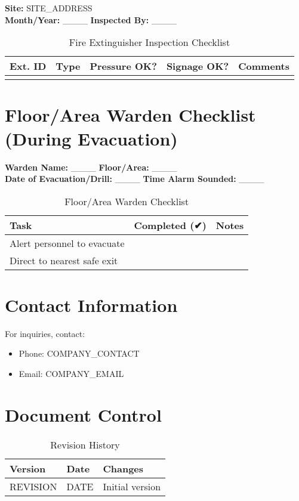 \documentclass[12pt]{article}
\begin{document}
\textbf{Site:} {{SITE_ADDRESS}}\\
\textbf{Month/Year:} \_\_\_\_ \textbf{Inspected By:} \_\_\_\_

\begin{table}[h]
    \centering
    \begin{tabular}{p{3cm}p{3cm}p{2cm}p{3cm}p{3cm}}
        \toprule
        \textbf{Ext. ID} & \textbf{Type} & \textbf{Pressure OK?} & \textbf{Signage OK?} & \textbf{Comments} \\
        \midrule
        & & & & \\
        \bottomrule
    \end{tabular}
    \caption{Fire Extinguisher Inspection Checklist}
\end{table}

\section{Floor/Area Warden Checklist (During Evacuation)}

\textbf{Warden Name:} \_\_\_\_ \textbf{Floor/Area:} \_\_\_\_\\
\textbf{Date of Evacuation/Drill:} \_\_\_\_ \textbf{Time Alarm Sounded:} \_\_\_\_

\begin{table}[h]
    \centering
    \begin{tabular}{p{8cm}p{2cm}p{6cm}}
        \toprule
        \textbf{Task} & \textbf{Completed (✔)} & \textbf{Notes} \\
        \midrule
        Alert personnel to evacuate & & \\
        Direct to nearest safe exit & & \\
        \bottomrule
    \end{tabular}
    \caption{Floor/Area Warden Checklist}
\end{table}

\section{Contact Information}
For inquiries, contact:
\begin{itemize}
    \item Phone: {{COMPANY_CONTACT}}
    \item Email: {{COMPANY_EMAIL}}
\end{itemize}

\section{Document Control}
\begin{table}[h]
    \centering
    \begin{tabular}{p{3cm}p{3cm}p{6cm}}
        \toprule
        \textbf{Version} & \textbf{Date} & \textbf{Changes} \\
        \midrule
        {{REVISION}} & {{DATE}} & Initial version \\
        \bottomrule
    \end{tabular}
    \caption{Revision History}
\end{table}
\end{document}
